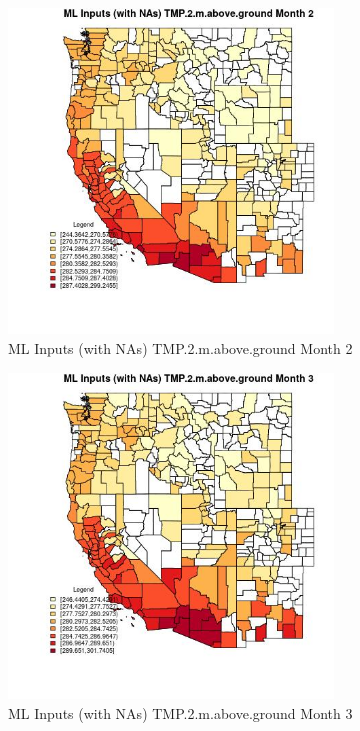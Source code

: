 \begin{figure} 
\centering  
\includegraphics[width=0.77\textwidth]{Code_Outputs/Report_ML_input_PM25_Step4_part_f_de_duplicated_aves_prioritize_24hr_obswNAs_CountyTMP2mabovegroundmedianMonth2.jpg} 
\caption{\label{fig:Report_ML_input_PM25_Step4_part_f_de_duplicated_aves_prioritize_24hr_obswNAsCountyTMP2mabovegroundmedianMonth2}ML Inputs (with NAs) TMP.2.m.above.ground Month 2} 
\end{figure} 
 

\begin{figure} 
\centering  
\includegraphics[width=0.77\textwidth]{Code_Outputs/Report_ML_input_PM25_Step4_part_f_de_duplicated_aves_prioritize_24hr_obswNAs_CountyTMP2mabovegroundmedianMonth3.jpg} 
\caption{\label{fig:Report_ML_input_PM25_Step4_part_f_de_duplicated_aves_prioritize_24hr_obswNAsCountyTMP2mabovegroundmedianMonth3}ML Inputs (with NAs) TMP.2.m.above.ground Month 3} 
\end{figure} 
 

